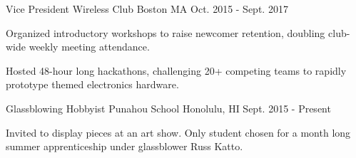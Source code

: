 

\begin{cventries}

  \cventry
    {Vice President} %
    {Wireless Club} %
    {Boston MA} %
    {Oct. 2015 - Sept. 2017} %
    {
      \begin{cvitems} %
        \item {Organized introductory workshops to raise newcomer retention, doubling club-wide weekly meeting attendance.}
        \item {Hosted 48-hour long hackathons, challenging 20+ competing teams to rapidly prototype themed electronics hardware.}
      \end{cvitems}
    }
    
    \cventry
    {Glassblowing Hobbyist} %
    {Punahou School} %
    {Honolulu, HI} %
    {Sept. 2015 - Present} %
    {
      \begin{cvitems} %
        \item {Invited to display pieces at an art show. Only student chosen for a month long summer apprenticeship under glassblower Russ Katto.}
      \end{cvitems}
    }

\end{cventries}
